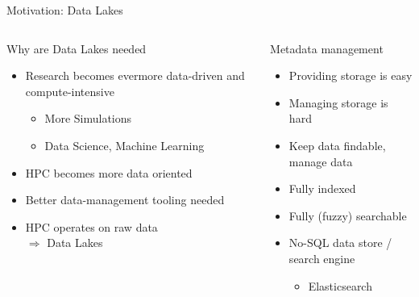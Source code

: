 \documentclass[compress,aspectratio=169]{beamer}
\begin{document}
  \begin{frame}{Motivation: Data Lakes}
    \begin{columns}
      \begin{column}{0.5\textwidth}
        \begin{block}{Why are Data Lakes needed}
          \begin{itemize}
            \item Research becomes evermore data-driven and compute-intensive
              \begin{itemize}
                \item More Simulations
                \item Data Science, Machine Learning
              \end{itemize}
            \item HPC becomes more data oriented
            \item Better data-management tooling needed
            \item HPC operates on raw data\\$\Rightarrow$ Data Lakes
          \end{itemize}
        \end{block}
      \end{column}
      \pause
      \begin{column}{0.5\textwidth}
        \begin{block}{Metadata management}
          \begin{itemize}
            \item Providing storage is easy
            \item Managing storage is hard
            \item Keep data findable, manage data
            \item Fully indexed
            \item Fully (fuzzy) searchable
            \item No-SQL data store / search engine
              \begin{itemize}
                \item Elasticsearch
              \end{itemize}
          \end{itemize}
        \end{block}
      \end{column}
    \end{columns}
  \end{frame}
\end{document}
